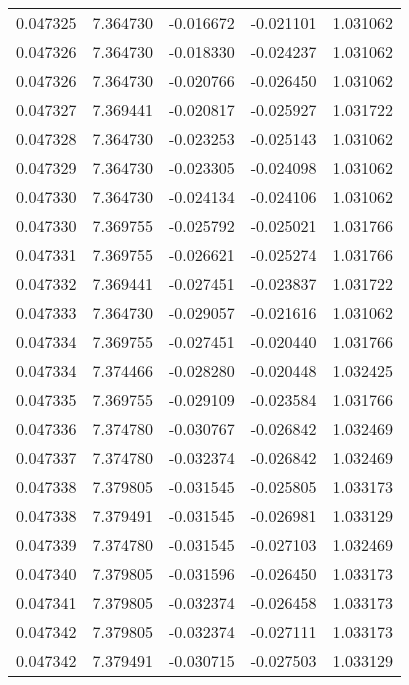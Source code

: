 \begin{tabular}{lrrrr}
0.047325    &  7.364730 & -0.016672 & -0.021101 &             1.031062 \\
0.047326    &  7.364730 & -0.018330 & -0.024237 &             1.031062 \\
0.047326    &  7.364730 & -0.020766 & -0.026450 &             1.031062 \\
0.047327    &  7.369441 & -0.020817 & -0.025927 &             1.031722 \\
0.047328    &  7.364730 & -0.023253 & -0.025143 &             1.031062 \\
0.047329    &  7.364730 & -0.023305 & -0.024098 &             1.031062 \\
0.047330    &  7.364730 & -0.024134 & -0.024106 &             1.031062 \\
0.047330    &  7.369755 & -0.025792 & -0.025021 &             1.031766 \\
0.047331    &  7.369755 & -0.026621 & -0.025274 &             1.031766 \\
0.047332    &  7.369441 & -0.027451 & -0.023837 &             1.031722 \\
0.047333    &  7.364730 & -0.029057 & -0.021616 &             1.031062 \\
0.047334    &  7.369755 & -0.027451 & -0.020440 &             1.031766 \\
0.047334    &  7.374466 & -0.028280 & -0.020448 &             1.032425 \\
0.047335    &  7.369755 & -0.029109 & -0.023584 &             1.031766 \\
0.047336    &  7.374780 & -0.030767 & -0.026842 &             1.032469 \\
0.047337    &  7.374780 & -0.032374 & -0.026842 &             1.032469 \\
0.047338    &  7.379805 & -0.031545 & -0.025805 &             1.033173 \\
0.047338    &  7.379491 & -0.031545 & -0.026981 &             1.033129 \\
0.047339    &  7.374780 & -0.031545 & -0.027103 &             1.032469 \\
0.047340    &  7.379805 & -0.031596 & -0.026450 &             1.033173 \\
0.047341    &  7.379805 & -0.032374 & -0.026458 &             1.033173 \\
0.047342    &  7.379805 & -0.032374 & -0.027111 &             1.033173 \\
0.047342    &  7.379491 & -0.030715 & -0.027503 &             1.033129 \\

\end{tabular}
